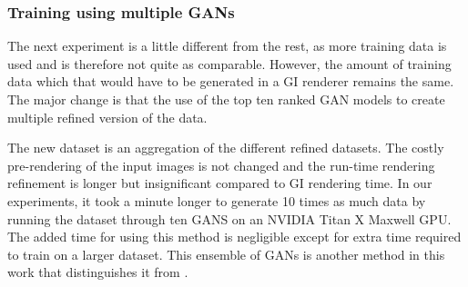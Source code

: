\documentclass[10pt,twocolumn,letterpaper]{article}
\newcommand{\edit}[1]{{\color{red} E: #1}}
\begin{document}

\subsubsection{Training using multiple GANs} \label{sec:multigans}
The next experiment is a little different from the rest, as more training data is used and is therefore not quite as comparable.  However, the amount of training data which that would have to be generated in a GI renderer remains the same.  The major change is that the use of the top ten ranked GAN models to create multiple refined version of the data.

The new dataset is an aggregation of the different refined datasets.  The costly pre-rendering of the input images is not changed and the run-time rendering refinement is longer but insignificant compared to GI rendering time.  In our experiments, it took a minute longer to generate 10 times as much data by running the dataset through ten GANS on an NVIDIA Titan X Maxwell GPU. %
The added time for using this method is negligible except for extra time required to train on a larger dataset. This ensemble of GANs is another method in this work that distinguishes it from \cite{Bousmalis2016UnsupervisedPD}.
\end{document}
